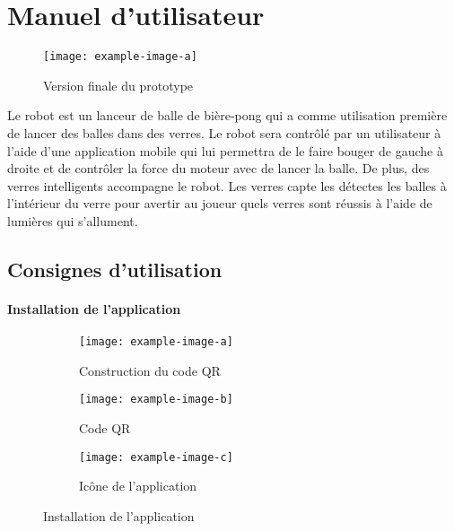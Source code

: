 \section{Manuel d’utilisateur}



\begin{wrapfigure}{r}{0.25\linewidth}
    \centering
    \texttt{[image: example-image-a]}
    \caption{Version finale du prototype}
    \label{fig:a1-protoype}
\end{wrapfigure}

Le robot est un lanceur de balle de bière-pong qui a comme utilisation première de lancer des balles dans des verres.
Le robot sera contrôlé par un utilisateur à l’aide d’une application mobile qui lui permettra de le faire bouger de gauche à droite et de contrôler la force du moteur avec de lancer la balle.
De plus, des verres intelligents accompagne le robot.
Les verres capte les détectes les balles à l’intérieur du verre pour avertir au joueur quels verres sont réussis à l’aide de lumières qui s’allument.

\subsection{Consignes d'utilisation}

\paragraph{Installation de l’application}

\begin{wrapfigure}{r}{0.5\linewidth}
    \centering

    \begin{subfigure}{0.8\linewidth}
        \centering
        \texttt{[image: example-image-a]}
        \caption{Construction du code QR}
        \label{fig:a1-create-code-QR}
    \end{subfigure}
    \begin{subfigure}{0.4\linewidth}
        \centering
        \texttt{[image: example-image-b]}
        \caption{Code QR}
        \label{fig:a1-code-QR}
    \end{subfigure}
    \begin{subfigure}{0.4\linewidth}
        \centering
        \texttt{[image: example-image-c]}
        \caption{Icône de l’application}
        \label{fig:a1-app-icon}
    \end{subfigure}

    \caption{Installation de l’application}
    \label{fig:template-example-flottante}
\end{wrapfigure}

